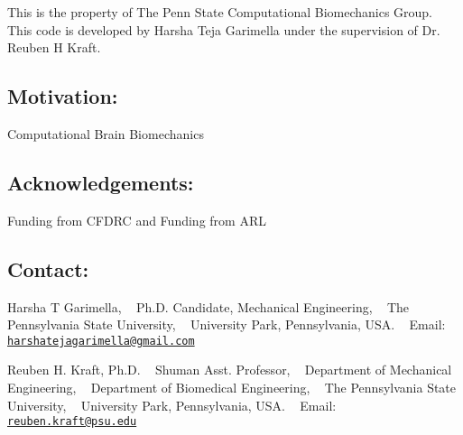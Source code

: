 This is the property of The Penn State Computational Biomechanics Group. ~\newline
This code is developed by Harsha Teja Garimella under the supervision of Dr. Reuben H Kraft.

\subsection*{Motivation\+:}

Computational Brain Biomechanics

\subsection*{Acknowledgements\+:}

Funding from C\+F\+D\+RC and Funding from A\+RL

\subsection*{Contact\+:}

Harsha T Garimella, ~\newline
 Ph.\+D. Candidate, Mechanical Engineering, ~\newline
 The Pennsylvania State University, ~\newline
 University Park, Pennsylvania, U\+SA. ~\newline
 Email\+: \href{mailto:harshatejagarimella@gmail.com}{\tt harshatejagarimella@gmail.\+com}

Reuben H. Kraft, Ph.\+D. ~\newline
 Shuman Asst. Professor, ~\newline
 Department of Mechanical Engineering, ~\newline
 Department of Biomedical Engineering, ~\newline
 The Pennsylvania State University, ~\newline
 University Park, Pennsylvania, U\+SA. ~\newline
 Email\+: \href{mailto:reuben.kraft@psu.edu}{\tt reuben.\+kraft@psu.\+edu} 
